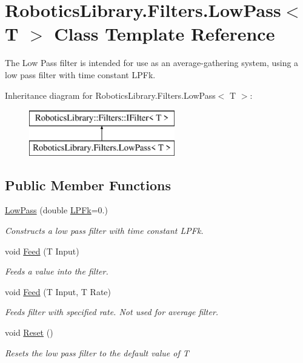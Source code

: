 \hypertarget{class_robotics_library_1_1_filters_1_1_low_pass}{}\section{Robotics\+Library.\+Filters.\+Low\+Pass$<$ T $>$ Class Template Reference}
\label{class_robotics_library_1_1_filters_1_1_low_pass}


The Low Pass filter is intended for use as an average-\/gathering system, using a low pass filter with time constant {\ttfamily L\+P\+Fk}. 


Inheritance diagram for Robotics\+Library.\+Filters.\+Low\+Pass$<$ T $>$\+:\begin{figure}[H]
\begin{center}
\leavevmode
\includegraphics[height=2.000000cm]{class_robotics_library_1_1_filters_1_1_low_pass}
\end{center}
\end{figure}
\subsection*{Public Member Functions}
\begin{DoxyCompactItemize}
\item 
\hyperlink{class_robotics_library_1_1_filters_1_1_low_pass_ada79534600a7f4a4dab17c40976a2f74}{Low\+Pass} (double \hyperlink{class_robotics_library_1_1_filters_1_1_low_pass_aa10538fde21bb3d7a4c5640b615c4013}{L\+P\+Fk}=0.)
\begin{DoxyCompactList}\small\item\em Constructs a low pass filter with time constant {\ttfamily L\+P\+Fk}.\end{DoxyCompactList}\item 
void \hyperlink{class_robotics_library_1_1_filters_1_1_low_pass_adba4c542b4935845404729ebb2222b72}{Feed} (T Input)
\begin{DoxyCompactList}\small\item\em Feeds a value into the filter. \end{DoxyCompactList}\item 
void \hyperlink{class_robotics_library_1_1_filters_1_1_low_pass_a9b8d610c0f54a17e84ea5e9252c9e215}{Feed} (T Input, T Rate)
\begin{DoxyCompactList}\small\item\em Feeds filter with specified rate. Not used for average filter. \end{DoxyCompactList}\item 
void \hyperlink{class_robotics_library_1_1_filters_1_1_low_pass_a4cc6f562359e222b75c634075cfc4881}{Reset} ()
\begin{DoxyCompactList}\small\item\em Resets the low pass filter to the default value of {\ttfamily T} \end{DoxyCompactList}\end{DoxyCompactItemize}
